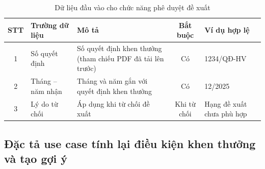 \documentclass[../DoAn.tex]{subfiles}
\begin{document}
\begin{table}[H]
\centering
\caption{Dữ liệu đầu vào cho chức năng phê duyệt đề xuất}
\label{tab:uc04-input}
\begin{tabular}{|c|p{3.2cm}|p{4.3cm}|c|p{2.5cm}|}
\hline
\textbf{STT} & \textbf{Trường dữ liệu} & \textbf{Mô tả} & \textbf{Bắt buộc} & \textbf{Ví dụ hợp lệ} \\ \hline
1 & Số quyết định & Số quyết định khen thưởng (tham chiếu PDF đã tải lên trước) & Có & 1234/QĐ-HV \\ \hline
2 & Tháng -- năm nhận & Tháng và năm gắn với quyết định khen thưởng & Có & 12/2025 \\ \hline
3 & Lý do từ chối & Áp dụng khi từ chối đề xuất & Khi từ chối & Hạng đề xuất chưa phù hợp \\ \hline
\end{tabular}
\end{table}

\subsection{Đặc tả use case tính lại điều kiện khen thưởng và tạo gợi ý}
\end{document}

